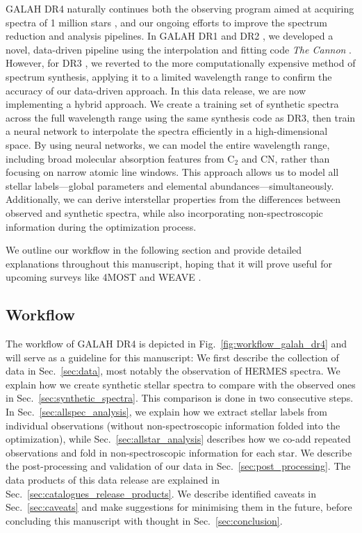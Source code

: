 \documentclass[
  journal=pasa,
  manuscript=research-paper, %
  year=2024,
  volume=37
]{cup-journal}
\begin{document}
GALAH DR4 naturally continues both the observing program aimed at acquiring spectra of 1 million stars \citep{DeSilva2015}, and our ongoing efforts to improve the spectrum reduction and analysis pipelines. In GALAH DR1 and DR2 \citep{Martell2017, Buder2018}, we developed a novel, data-driven pipeline using the interpolation and fitting code \textit{The Cannon} \citep{Ness2015}. However, for DR3 \citep{Buder2021}, we reverted to the more computationally expensive method of spectrum synthesis, applying it to a limited wavelength range to confirm the accuracy of our data-driven approach. In this data release, we are now implementing a hybrid approach. We create a training set of synthetic spectra across the full wavelength range using the same synthesis code as DR3, then train a neural network to interpolate the spectra efficiently in a high-dimensional space. By using neural networks, we can model the entire wavelength range, including broad molecular absorption features from $\mathrm{C_2}$ and CN, rather than focusing on narrow atomic line windows. This approach allows us to model all stellar labels—global parameters and elemental abundances—simultaneously. Additionally, we can derive interstellar properties from the differences between observed and synthetic spectra, while also incorporating non-spectroscopic information during the optimization process.

We outline our workflow in the following section and provide detailed explanations throughout this manuscript, hoping that it will prove useful for upcoming surveys like 4MOST \citep{4MOST2019} and WEAVE \citep{Dalton2014}.

\subsection{Workflow} \label{sec:workflow}

The workflow of GALAH DR4 is depicted in Fig.~\ref{fig:workflow_galah_dr4} and will serve as a guideline for this manuscript: We first describe the collection of data in Sec.~\ref{sec:data}, most notably the observation of HERMES spectra. We explain how we create synthetic stellar spectra to compare with the observed ones in Sec.~\ref{sec:synthetic_spectra}. This comparison is done in two consecutive steps. In Sec.~\ref{sec:allspec_analysis}, we explain how we extract stellar labels from individual observations (without non-spectroscopic information folded into the optimization), while Sec.~\ref{sec:allstar_analysis} describes how we co-add repeated observations and fold in non-spectroscopic information for each star. We describe the post-processing and validation of our data in Sec.~\ref{sec:post_processing}. The data products of this data release are explained in Sec.~\ref{sec:catalogues_release_products}. We describe identified caveats in Sec.~\ref{sec:caveats} and make suggestions for minimising them in the future, before concluding this manuscript with thought in Sec.~\ref{sec:conclusion}.
\end{document}
